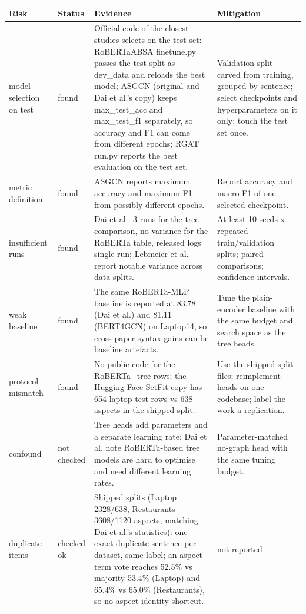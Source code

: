 \documentclass[11pt,a4paper]{article}
\begin{document}
{\small
\begin{longtable}{>{\raggedright\arraybackslash}p{}>{\raggedright\arraybackslash}p{}>{\raggedright\arraybackslash}p{}>{\raggedright\arraybackslash}p{}}
\toprule
\textbf{Risk} & \textbf{Status} & \textbf{Evidence} & \textbf{Mitigation} \\
\midrule
\endhead
model selection on test & found & [V] Official code of the closest studies selects on the test set: RoBERTaABSA finetune.py passes the test split as dev\_data and reloads the best model; ASGCN (original and Dai et al.'s copy) keeps max\_test\_acc and max\_test\_f1 separately, so accuracy and F1 can come from different epochs; RGAT run.py reports the best evaluation on the test set. \cite{dai2021syntax,zhang2019asgcn,wang2020rgat} & Validation split carved from training, grouped by sentence; select checkpoints and hyperparameters on it only; touch the test set once. \\
metric definition & found & [V] ASGCN reports maximum accuracy and maximum F1 from possibly different epochs. \cite{zhang2019asgcn} & Report accuracy and macro-F1 of one selected checkpoint. \\
insufficient runs & found & [V] Dai et al.: 3 runs for the tree comparison, no variance for the RoBERTa table, released logs single-run; Lebmeier et al. report notable variance across data splits. \cite{dai2021syntax,lebmeier2023repro} & At least 10 seeds x repeated train/validation splits; paired comparisons; confidence intervals. \\
weak baseline & found & [V] The same RoBERTa-MLP baseline is reported at 83.78 (Dai et al.) and 81.11 (BERT4GCN) on Laptop14, so cross-paper syntax gains can be baseline artefacts. \cite{dai2021syntax,xiao2021bert4gcn} & Tune the plain-encoder baseline with the same budget and search space as the tree heads. \\
protocol mismatch & found & [V] No public code for the RoBERTa+tree rows; the Hugging Face SetFit copy has 654 laptop test rows vs 638 aspects in the shipped split. \cite{dai2021syntax} & Use the shipped split files; reimplement heads on one codebase; label the work a replication. \\
confound & not checked & Tree heads add parameters and a separate learning rate; Dai et al. note RoBERTa-based tree models are hard to optimise and need different learning rates. & Parameter-matched no-graph head with the same tuning budget. \\
duplicate items & checked ok & [V] Shipped splits (Laptop 2328/638, Restaurants 3608/1120 aspects, matching Dai et al.'s statistics): one exact duplicate sentence per dataset, same label; an aspect-term vote reaches 52.5\% vs majority 53.4\% (Laptop) and 65.4\% vs 65.0\% (Restaurants), so no aspect-identity shortcut. \cite{dai2021syntax} & not reported \\

\end{longtable}}
\end{document}
